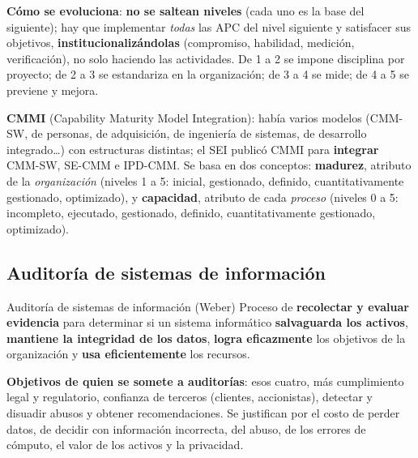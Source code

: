 \documentclass[11pt,a4paper]{article}
\begin{document}
\textbf{Cómo se evoluciona}: \textbf{no se saltean niveles} (cada uno es la base del siguiente); hay que
implementar \emph{todas} las APC del nivel siguiente y satisfacer sus objetivos, \textbf{institucionalizándolas}
(compromiso, habilidad, medición, verificación), no solo haciendo las actividades. De 1 a 2 se impone disciplina
por proyecto; de 2 a 3 se estandariza en la organización; de 3 a 4 se mide; de 4 a 5 se previene y mejora.

\textbf{CMMI} (Capability Maturity Model Integration): había varios modelos (CMM-SW, de personas, de
adquisición, de ingeniería de sistemas, de desarrollo integrado\ldots) con estructuras distintas; el SEI publicó
CMMI para \textbf{integrar} CMM-SW, SE-CMM e IPD-CMM. Se basa en dos conceptos: \textbf{madurez}, atributo de
la \emph{organización} (niveles 1 a 5: inicial, gestionado, definido, cuantitativamente gestionado, optimizado),
y \textbf{capacidad}, atributo de cada \emph{proceso} (niveles 0 a 5: incompleto, ejecutado, gestionado,
definido, cuantitativamente gestionado, optimizado).


\subsection{Auditoría de sistemas de información}
\begin{defbox}{Auditoría de sistemas de información (Weber)}
Proceso de \textbf{recolectar y evaluar evidencia} para determinar si un sistema informático
\textbf{salvaguarda los activos}, \textbf{mantiene la integridad de los datos}, \textbf{logra eficazmente} los
objetivos de la organización y \textbf{usa eficientemente} los recursos.
\end{defbox}
\textbf{Objetivos de quien se somete a auditorías}: esos cuatro, más cumplimiento legal y regulatorio, confianza
de terceros (clientes, accionistas), detectar y disuadir abusos y obtener recomendaciones. Se justifican por el
costo de perder datos, de decidir con información incorrecta, del abuso, de los errores de cómputo, el valor de
los activos y la privacidad.
\end{document}
